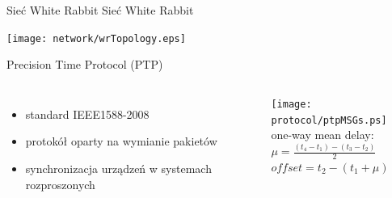 \documentclass[compress,red]{beamer}
\begin{document}
\begin{frame}{Sieć White Rabbit}
\center Sieć White Rabbit
  \begin{center}
  \texttt{[image: network/wrTopology.eps]}
  \end{center}
\end{frame}
\begin{frame}{Precision Time Protocol (PTP)}
\begin{columns}[c]
\column{2.8in}

  \begin{itemize}
    \item standard IEEE1588-2008
    \item protokół oparty na wymianie pakietów
    \item synchronizacja urządzeń w systemach rozproszonych
  \end{itemize}

\column{1.5in}
    \texttt{[image: protocol/ptpMSGs.ps]} \\
    \small 
    one-way mean delay: \\
    $\mu = \frac{(t_{4}-t_{1}) - (t_{3}-t_{2})}{2}$ \\
    \small 
    $offset = t_{2} - (t_{1} + \mu)$
    
\end{columns}


\end{frame}
\end{document}
